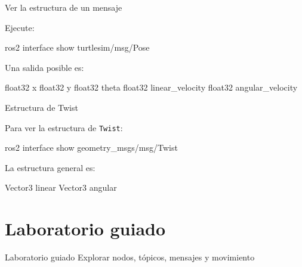 \documentclass[aspectratio=169]{beamer}
\begin{document}
\begin{frame}[fragile]{Ver la estructura de un mensaje}

Ejecute:

\begin{bashcodedark}
    ros2 interface show turtlesim/msg/Pose
\end{bashcodedark}

Una salida posible es:

\begin{bashcode}
    float32 x
    float32 y
    float32 theta
    float32 linear_velocity
    float32 angular_velocity
\end{bashcode}

\vspace{0.3cm}


\end{frame}

\begin{frame}[fragile]{Estructura de Twist}

Para ver la estructura de \texttt{Twist}:

\begin{bashcodedark}
    ros2 interface show geometry_msgs/msg/Twist
\end{bashcodedark}

La estructura general es:

\begin{bashcode}
    Vector3  linear
    Vector3  angular
\end{bashcode}

\vspace{0.3cm}


\end{frame}

\section{Laboratorio guiado}

\SectionSlide
{Laboratorio guiado}
{Explorar nodos, tópicos, mensajes y movimiento}
\end{document}
